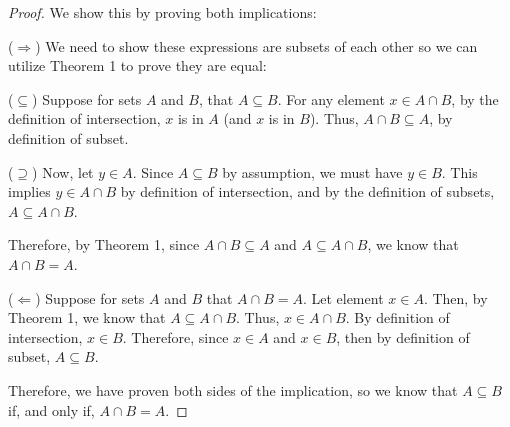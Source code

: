 \begin{customframedproof}[linecolor=kindapink]
    \begin{proof}
    We show this by proving both implications:
        \begin{proofpart}[kindapink]{(\(\Rightarrow\))}
                We need to show these expressions are subsets of each other so we can utilize Theorem 1 to prove they are equal: 
                \begin{proofpart}[kindapink]{(\(\subseteq\))}
                    Suppose for sets $A$ and $B$, that $A\subseteq B$. For any element $x \in A\cap B$, by the definition of intersection, $x$ is in $A$ (and $x$ is in $B$). Thus, $A\cap B \subseteq A$, by definition of subset. 
                \end{proofpart}
                \begin{proofpart}[kindapink]{(\(\supseteq\))}
                    Now, let $y\in A$. Since $A\subseteq B$ by assumption, we must have $y\in B$. This implies $y\in A \cap B$ by definition of intersection, and by the definition of subsets, $A \subseteq A\cap B$.
                \end{proofpart}
                Therefore, by Theorem 1, since $A\cap B\subseteq A$ and $A\subseteq A\cap B$, we know that $A\cap B = A$.
        \end{proofpart}
        \begin{proofpart}[kindapink]{(\(\Leftarrow\))}
            Suppose for sets $A$ and $B$ that $A \cap B = A$. Let element $x\in A$. Then, by Theorem 1, we know that $A \subseteq A\cap B$. Thus, $x\in A \cap B$. By definition of intersection, $x \in B$. Therefore, since $x\in A$ and $x\in B$, then by definition of subset, $A\subseteq B$.
        \end{proofpart}
        Therefore, we have proven both sides of the implication, so we know that $A\subseteq B$ if, and only if, $A \cap B = A$.
    \end{proof}
\end{customframedproof}